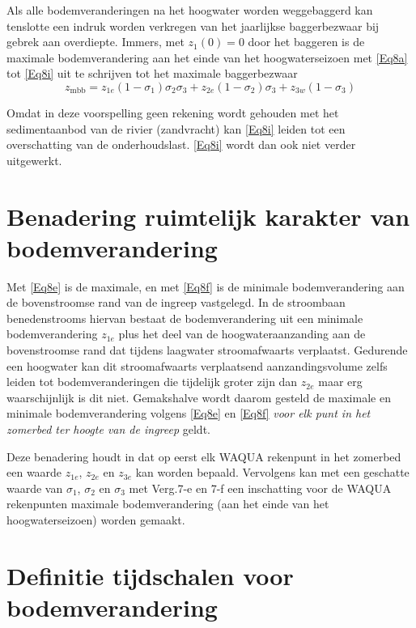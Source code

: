 Als alle bodemveranderingen na het hoogwater worden weggebaggerd kan tenslotte een indruk worden verkregen van het jaarlijkse baggerbezwaar bij gebrek aan overdiepte.
Immers, met $z_1(0)=0$ door het baggeren is de maximale bodemverandering aan het einde van het hoogwaterseizoen met \autoref{Eq8a} tot \autoref{Eq8i} uit te schrijven tot het maximale baggerbezwaar
%
\begin{equation}
z_\text{mbb} = z_{1e}(1-\sigma_1) \sigma_2 \sigma_3 + z_{2e} (1-\sigma_2) \sigma_3 + z_{3w} (1-\sigma_3)
\label{Eq8i}
\end{equation}

Omdat in deze voorspelling geen rekening wordt gehouden met het sedimentaanbod van de rivier (zandvracht) kan \autoref{Eq8i} leiden tot een overschatting van de onderhoudslast.
\autoref{Eq8i} wordt dan ook niet verder uitgewerkt.

\section{Benadering ruimtelijk karakter van bodemverandering}

Met \autoref{Eq8e} is de maximale, en met \autoref{Eq8f} is de minimale bodemverandering aan de bovenstroomse rand van de ingreep vastgelegd.
In de stroombaan benedenstrooms hiervan bestaat de bodemverandering uit een minimale bodemverandering $z_{1e}$ plus het deel van de hoogwateraanzanding aan de bovenstroomse rand dat tijdens laagwater stroomafwaarts verplaatst.
Gedurende een hoogwater kan dit stroomafwaarts verplaatsend aanzandingsvolume zelfs leiden tot bodemveranderingen die tijdelijk groter
zijn dan $z_{2e}$ maar erg waarschijnlijk is dit niet.
Gemakshalve wordt daarom gesteld de maximale en minimale bodemverandering volgens \autoref{Eq8e} en \autoref{Eq8f} \emph{voor elk punt in het zomerbed ter hoogte van de ingreep} geldt.

Deze benadering houdt in dat op eerst elk WAQUA rekenpunt in het zomerbed een waarde $z_{1e}$, $z_{2e}$ en $z_{3e}$ kan worden bepaald.
Vervolgens kan met een geschatte waarde van $\sigma_1$, $\sigma_2$ en $\sigma_3$ met Verg.7-e en 7-f een inschatting voor de WAQUA rekenpunten maximale bodemverandering (aan het einde van het hoogwaterseizoen) worden gemaakt.

\section{Definitie tijdschalen voor bodemverandering}

